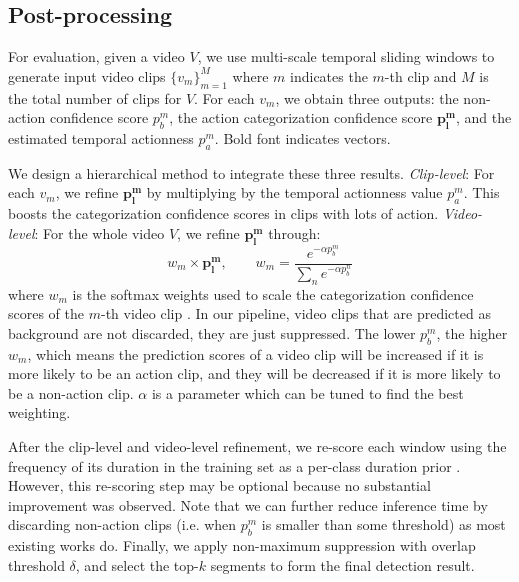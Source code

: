 \documentclass[10pt,twocolumn,letterpaper]{article}
\begin{document}
\subsection{Post-processing}
For evaluation, given a video $V$,  we use multi-scale temporal sliding windows to generate input video clips $\{v_{m}\}_{m=1}^{M}$ where $m$ indicates the $m$-th clip and $M$ is the total number of clips for $V$. For each $v_{m}$, we obtain three outputs: the non-action confidence score $p_{b}^{m}$, the action categorization confidence score $\mathbf{p_{l}^{m}}$, and the estimated temporal actionness $p_{a}^{m}$. Bold font indicates vectors.

We design a hierarchical method to integrate these three results. \textit{Clip-level}: For each $v_{m}$, we refine $\mathbf{p_{l}^{m}}$ by multiplying by the temporal actionness value $p_{a}^{m}$. This boosts the categorization confidence scores in clips with lots of action. \textit{Video-level}: For the whole video $V$, we refine $\mathbf{p_{l}^{m}}$ through:
\begin{equation}
	w_{m} \times \mathbf{p_{l}^{m}}, \quad \quad w_{m} = \frac{e^{-\alpha p_{b}^{m}}}{\sum_{n} e^{-\alpha p_{b}^{n}}}
	\label{eq:softmaxWeights}
\end{equation}
where $w_{m}$ is the softmax weights used to scale the categorization confidence scores of the $m$-th video clip \cite{non_action_wang_cvpr16}. In our pipeline, video clips that are predicted as background are not discarded, they are just suppressed. The lower $p_{b}^{m}$, the higher $w_{m}$, which means the prediction scores of a video clip will be increased if it is more likely to be an action clip, and they will be decreased if it is more likely to be a non-action clip. $\alpha$ is a parameter which can be tuned to find the best weighting.

After the clip-level and video-level refinement, we re-score each window using the frequency of its duration in the training set as a per-class duration prior \cite{compact_fisher_action_oneata_iccv13}. However, this re-scoring step may be optional because no substantial improvement was observed. Note that we can further reduce inference time by discarding non-action clips (i.e. when $p_{b}^{m}$ is smaller than some threshold) as most existing works do.
Finally, we apply non-maximum suppression with overlap threshold $\delta$, and select the top-$k$ segments to form the final detection result.
\end{document}
